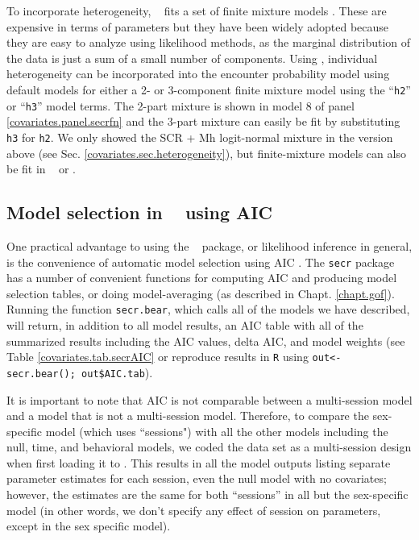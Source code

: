 To incorporate heterogeneity, \secr~ fits a set of 
finite mixture models \citep{norris_pollock:1996,
  pledger:2000}. These are expensive in terms of parameters but 
they have been widely adopted because they are easy to analyze using
likelihood methods, as the marginal distribution of the data is just a
sum of a small number of components.
Using \secr,  individual heterogeneity can be incorporated
into the encounter probability model using default models for 
 either a 2- or 3-component finite
mixture model 
using the  ``\mbox{\tt h2}'' or
``\mbox{\tt h3}'' model terms.
 The 2-part mixture is shown in model 8 of panel
\ref{covariates.panel.secrfn} and the 3-part mixture can easily be fit by
substituting \mbox{\tt h3} for \mbox{\tt h2}.  
We only showed
the SCR + Mh logit-normal mixture in the version above (see
Sec. \ref{covariates.sec.heterogeneity}), but finite-mixture models can also be
fit in \jags~ or \bugs.



\subsection{Model selection in \secr~ using AIC}

One practical advantage to using the \secr~ package, or likelihood
inference in general, is the convenience of automatic model selection
using AIC \citep{burnham_anderson:2002}. The \mbox{\tt secr} package
has a number of convenient functions for computing AIC and producing
model selection tables, or doing model-averaging (as described in
 Chapt. \ref{chapt.gof}).
Running the function {\tt secr.bear}, which calls all of the models we
have described, will return, in addition to all model results, 
an AIC table with all of the summarized results including the AIC values,
delta AIC, and model weights (see Table \ref{covariates.tab.secrAIC}
or reproduce results in {\tt R} using {\tt out<- secr.bear(); out\$AIC.tab}). 


It is important to note that AIC is not comparable 
between a multi-session model and a model that is not a multi-session model.
Therefore, to compare the sex-specific model (which uses ``sessions") with all the other models
including the null, time, and behavioral models, we coded the data set as a 
multi-session design when first loading it to \secr.  This results in 
all the model outputs listing separate parameter estimates for each session, even the null model
with no covariates; however, the estimates are the same for both ``sessions''
in all but the sex-specific model (in other words, we don't specify any effect of 
session on parameters, except in the sex specific model). 


